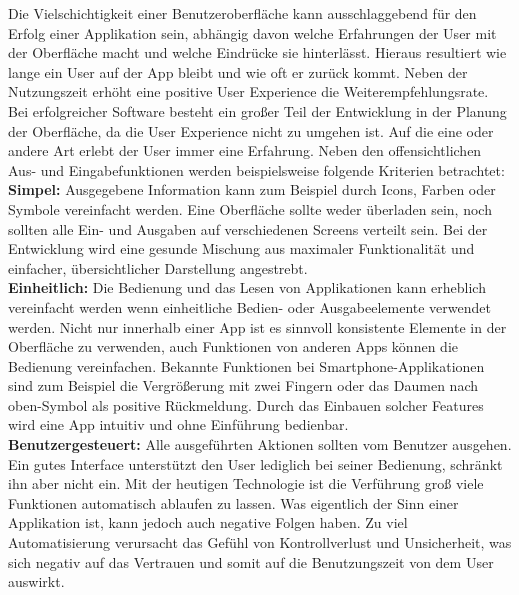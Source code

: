 Die Vielschichtigkeit einer Benutzeroberfläche kann ausschlaggebend für den Erfolg einer Applikation sein, abhängig davon welche Erfahrungen der User mit der Oberfläche macht und welche Eindrücke sie hinterlässt. Hieraus resultiert wie lange ein User auf der App bleibt und wie oft er zurück kommt. Neben der Nutzungszeit erhöht eine positive User Experience die Weiterempfehlungsrate.\\
Bei erfolgreicher Software besteht ein großer Teil der Entwicklung in der Planung der Oberfläche, da die User Experience nicht zu umgehen ist. Auf die eine oder andere Art erlebt der User immer eine Erfahrung. Neben den offensichtlichen Aus- und Eingabefunktionen werden beispielsweise folgende Kriterien  betrachtet:\\

\noindent
{}
\textbf{Simpel:} Ausgegebene Information kann zum Beispiel durch Icons, Farben oder Symbole vereinfacht werden. Eine Oberfläche sollte weder überladen sein, noch sollten alle Ein- und Ausgaben auf verschiedenen Screens verteilt sein. Bei der Entwicklung wird eine gesunde Mischung aus maximaler Funktionalität und einfacher, übersichtlicher Darstellung angestrebt.\\

\noindent
{}
\textbf{Einheitlich:} Die Bedienung und das Lesen von Applikationen kann erheblich vereinfacht werden wenn einheitliche Bedien- oder Ausgabeelemente verwendet werden. Nicht nur innerhalb einer App ist es sinnvoll konsistente Elemente in der Oberfläche zu verwenden, auch Funktionen von anderen Apps können die Bedienung vereinfachen. Bekannte Funktionen bei Smartphone-Applikationen sind zum Beispiel die Vergrößerung mit zwei Fingern oder das \glqq Daumen nach oben\grqq -Symbol als positive Rückmeldung. Durch das  Einbauen solcher Features wird eine App intuitiv und ohne Einführung bedienbar.\\

\noindent
{}
\textbf{Benutzergesteuert:} Alle ausgeführten Aktionen sollten vom Benutzer ausgehen. Ein gutes Interface unterstützt den User lediglich bei seiner Bedienung, schränkt ihn aber nicht ein. Mit der heutigen Technologie ist die Verführung groß viele Funktionen automatisch ablaufen zu lassen. Was eigentlich der Sinn einer Applikation ist, kann jedoch auch negative Folgen haben. Zu viel Automatisierung verursacht das Gefühl von Kontrollverlust und Unsicherheit, was sich negativ auf das Vertrauen und somit auf die Benutzungszeit von dem User auswirkt. \\

